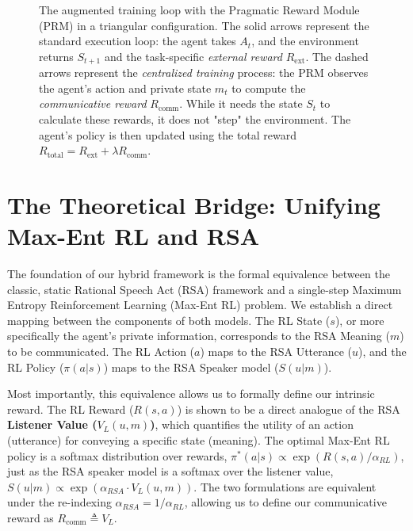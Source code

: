 \documentclass[12pt, a4paper]{report}
\newcommand{\Rcomm}{R_{\text{comm}}}
\newcommand{\Rext}{R_{\text{ext}}}
\newcommand{\Rtotal}{R_{\text{total}}}
\newcommand{\VL}{V_L}
\begin{document}
\begin{figure}[h!]
    
    \caption{
        The augmented training loop with the Pragmatic Reward Module (PRM) in a triangular configuration. 
        The solid arrows represent the standard execution loop: the agent takes $A_t$, and the environment returns $S_{t+1}$ and the task-specific \textit{external reward} $\Rext$.
        The dashed arrows represent the \textit{centralized training} process: the PRM observes the agent's action and private state $m_t$ to compute the \textit{communicative reward} $\Rcomm$. While it needs the state $S_{t}$ to calculate these rewards, it does not "step" the environment.
        The agent's policy is then updated using the total reward $\Rtotal = \Rext + \lambda \Rcomm$.
    }
    \label{fig:prm_loop_triangle}
\end{figure}

\section{The Theoretical Bridge: Unifying Max-Ent RL and RSA}
The foundation of our hybrid framework is the formal equivalence between the classic, static Rational Speech Act (RSA) framework and a single-step Maximum Entropy Reinforcement Learning (Max-Ent RL) problem. We establish a direct mapping between the components of both models. The RL State ($s$), or more specifically the agent's private information, corresponds to the RSA Meaning ($m$) to be communicated. The RL Action ($a$) maps to the RSA Utterance ($u$), and the RL Policy ($\pi(a|s)$) maps to the RSA Speaker model ($S(u|m)$).

Most importantly, this equivalence allows us to formally define our intrinsic reward. The RL Reward ($R(s,a)$) is shown to be a direct analogue of the RSA \textbf{Listener Value ($V_L(u,m)$)}, which quantifies the utility of an action (utterance) for conveying a specific state (meaning). The optimal Max-Ent RL policy is a softmax distribution over rewards, $\pi^{*}(a|s)\propto \exp(R(s,a)/\alpha_{RL})$, just as the RSA speaker model is a softmax over the listener value, $S(u|m)\propto \exp(\alpha_{RSA}\cdot V_{L}(u,m))$. The two formulations are equivalent under the re-indexing $\alpha_{RSA}=1/\alpha_{RL}$, allowing us to define our communicative reward as $\Rcomm \triangleq \VL$.
\end{document}
